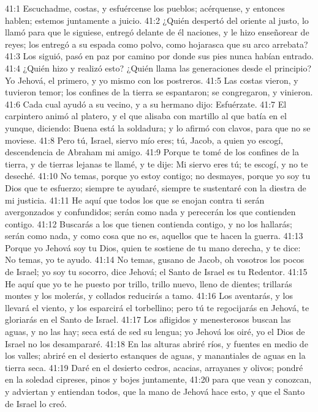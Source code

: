 41:1 Escuchadme, costas, y esfuércense los pueblos; acérquense, y entonces hablen; estemos juntamente a juicio. 
41:2 ¿Quién despertó del oriente al justo, lo llamó para que le siguiese, entregó delante de él naciones, y le hizo enseñorear de reyes; los entregó a su espada como polvo, como hojarasca que su arco arrebata? 
41:3 Los siguió, pasó en paz por camino por donde sus pies nunca habían entrado. 
41:4 ¿Quién hizo y realizó esto? ¿Quién llama las generaciones desde el principio? Yo Jehová, el primero, y yo mismo con los postreros. 
41:5 Las costas vieron, y tuvieron temor; los confines de la tierra se espantaron; se congregaron, y vinieron. 
41:6 Cada cual ayudó a su vecino, y a su hermano dijo: Esfuérzate. 
41:7 El carpintero animó al platero, y el que alisaba con martillo al que batía en el yunque, diciendo: Buena está la soldadura; y lo afirmó con clavos, para que no se moviese. 
41:8 Pero tú, Israel, siervo mío eres; tú, Jacob, a quien yo escogí, descendencia de Abraham mi amigo. 
41:9 Porque te tomé de los confines de la tierra, y de tierras lejanas te llamé, y te dije: Mi siervo eres tú; te escogí, y no te deseché. 
41:10 No temas, porque yo estoy contigo; no desmayes, porque yo soy tu Dios que te esfuerzo; siempre te ayudaré, siempre te sustentaré con la diestra de mi justicia. 
41:11 He aquí que todos los que se enojan contra ti serán avergonzados y confundidos; serán como nada y perecerán los que contienden contigo. 
41:12 Buscarás a los que tienen contienda contigo, y no los hallarás; serán como nada, y como cosa que no es, aquellos que te hacen la guerra. 
41:13 Porque yo Jehová soy tu Dios, quien te sostiene de tu mano derecha, y te dice: No temas, yo te ayudo. 
41:14 No temas, gusano de Jacob, oh vosotros los pocos de Israel; yo soy tu socorro, dice Jehová; el Santo de Israel es tu Redentor. 
41:15 He aquí que yo te he puesto por trillo, trillo nuevo, lleno de dientes; trillarás montes y los molerás, y collados reducirás a tamo. 
41:16 Los aventarás, y los llevará el viento, y los esparcirá el torbellino; pero tú te regocijarás en Jehová, te gloriarás en el Santo de Israel. 
41:17 Los afligidos y menesterosos buscan las aguas, y no las hay; seca está de sed su lengua; yo Jehová los oiré, yo el Dios de Israel no los desampararé. 
41:18 En las alturas abriré ríos, y fuentes en medio de los valles; abriré en el desierto estanques de aguas, y manantiales de aguas en la tierra seca. 
41:19 Daré en el desierto cedros, acacias, arrayanes y olivos; pondré en la soledad cipreses, pinos y bojes juntamente, 
41:20 para que vean y conozcan, y adviertan y entiendan todos, que la mano de Jehová hace esto, y que el Santo de Israel lo creó. 
